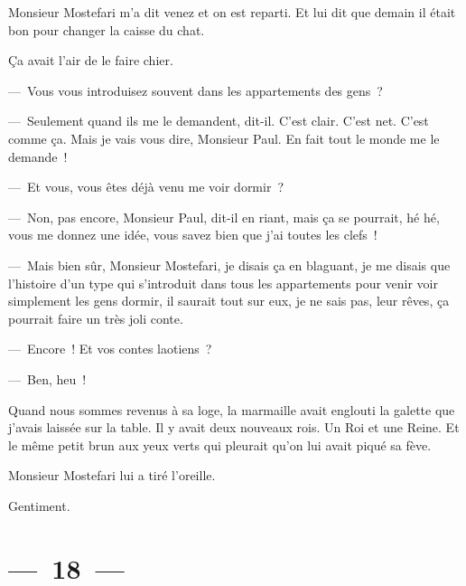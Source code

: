 \documentclass[french,twoside]{book} %
\begin{document}
Monsieur Mostefari m’a dit venez et on est reparti. Et lui dit que demain il était bon pour changer la caisse du chat.\par
Ça avait l’air de le faire chier.\par
— Vous vous introduisez souvent dans les appartements des gens ?\par
— Seulement quand ils me le demandent, dit-il. C’est clair. C’est net. C’est comme ça. Mais je vais vous dire, Monsieur Paul. En fait tout le monde me le demande !\par
— Et vous, vous êtes déjà venu me voir dormir ?\par
— Non, pas encore, Monsieur Paul, dit-il en riant, mais ça se pourrait, hé hé, vous me donnez une idée, vous savez bien que j’ai toutes les clefs !\par
— Mais bien sûr, Monsieur Mostefari, je disais ça en blaguant, je me disais que l’histoire d’un type qui s’introduit dans tous les appartements pour venir voir simplement les gens dormir, il saurait tout sur eux, je ne sais pas, leur rêves, ça pourrait faire un très joli conte.\par
— Encore ! Et vos contes laotiens ?\par
— Ben, heu !\par
Quand nous sommes revenus à sa loge, la marmaille avait englouti la galette que j’avais laissée sur la table. Il y avait deux nouveaux rois. Un Roi et une Reine. Et le même petit brun aux yeux verts qui pleurait qu’on lui avait piqué sa fève.\par
Monsieur Mostefari lui a tiré l’oreille.\par
Gentiment.

\section[{— 18 —}]{— 18 —}
\renewcommand{\leftmark}{— 18 —}
\end{document}
